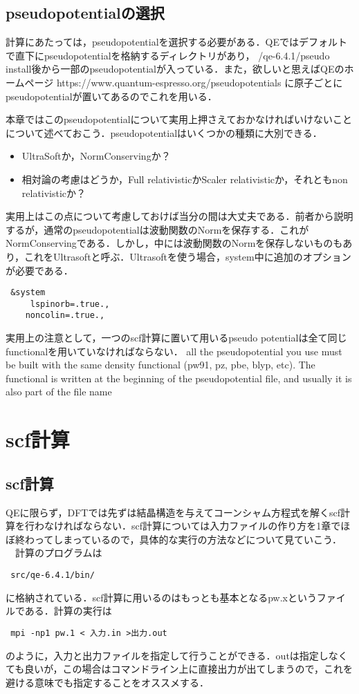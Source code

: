 \documentclass[a4j]{jarticle}
\begin{document}
\subsection{pseudopotentialの選択}
計算にあたっては，pseudopotentialを選択する必要がある．QEではデフォルトで直下にpseudopotentialを格納するディレクトリがあり，
/qe-6.4.1/pseudo
install後から一部のpseudopotentialが入っている．また，欲しいと思えばQEのホームページ
https://www.quantum-espresso.org/pseudopotentials
に原子ごとにpseudopotentialが置いてあるのでこれを用いる．

本章ではこのpseudopotentialについて実用上押さえておかなければいけないことについて述べておこう．pseudopotentialはいくつかの種類に大別できる．
\begin{itemize}
 \item UltraSoftか，NormConservingか？
 \item 相対論の考慮はどうか，Full relativisticかScaler relativisticか，それともnon relativisticか？
\end{itemize}
実用上はこの点について考慮しておけば当分の間は大丈夫である．前者から説明するが，通常のpseudopotentialは波動関数のNormを保存する．これがNormConservingである．しかし，中には波動関数のNormを保存しないものもあり，これをUltrasoftと呼ぶ．Ultrasoftを使う場合，system中に追加のオプションが必要である．
\begin{lstlisting}
 &system
     lspinorb=.true.,
    noncolin=.true.,
\end{lstlisting}


実用上の注意として，一つのscf計算に置いて用いるpseudo potentialは全て同じfunctionalを用いていなければならない．
all the pseudopotential you use must be built with the same density functional
(pw91, pz, pbe, blyp, etc). The functional is written at the beginning of the
pseudopotential file, and usually it is also part of the file name

\section{scf計算}
\subsection{scf計算}
QEに限らず，DFTでは先ずは結晶構造を与えてコーンシャム方程式を解くscf計算を行わなければならない．scf計算については入力ファイルの作り方を1章でほぼ終わってしまっているので，具体的な実行の方法などについて見ていこう．
　計算のプログラムは
\begin{lstlisting}
 src/qe-6.4.1/bin/
\end{lstlisting}
に格納されている．scf計算に用いるのはもっとも基本となるpw.xというファイルである．計算の実行は
\begin{lstlisting}
 mpi -np1 pw.1 < 入力.in >出力.out
\end{lstlisting}
のように，入力と出力ファイルを指定して行うことができる．outは指定しなくても良いが，この場合はコマンドライン上に直接出力が出てしまうので，これを避ける意味でも指定することをオススメする．
\end{document}
